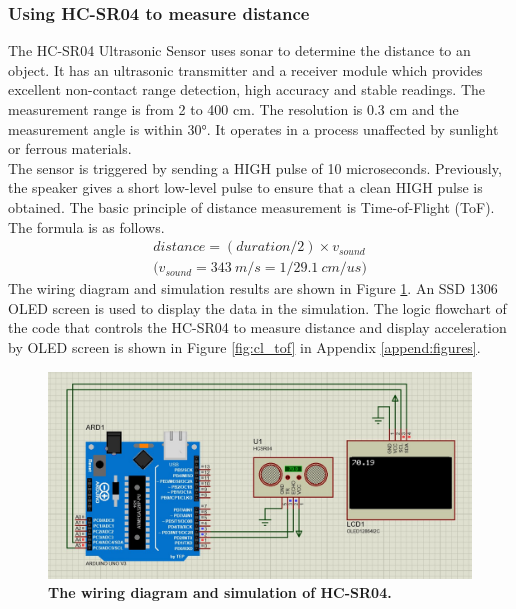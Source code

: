 \subsubsection{Using HC-SR04 to measure distance}
The HC-SR04 Ultrasonic Sensor uses sonar to determine the distance to an object. It has an ultrasonic 
transmitter and a receiver module which provides excellent non-contact range detection, high accuracy and 
stable readings. The measurement range is from 2 to 400 cm. The resolution is 0.3 cm and the measurement angle 
is within 30°. It operates in a process unaffected by sunlight or ferrous materials. \\
The sensor is triggered by sending a HIGH pulse of 10 microseconds. Previously, the speaker gives a short 
low-level pulse to ensure that a clean HIGH pulse is obtained. 
The basic principle of distance measurement is Time-of-Flight (ToF). The formula is as follows.
\vspace{-10mm}
\begin{align}
    distance = (duration/2) \times v_{sound} \\
    \text{(}v_{sound} = 343\ m/s = 1/29.1\ cm/us \text{)}\nonumber
\end{align}
\noindent The wiring diagram and simulation results are shown in Figure \ref{fig:tof}. An SSD 1306 OLED screen 
is used to display the data in the simulation. The logic flowchart of the code that controls the HC-SR04 to measure 
distance and display acceleration by OLED screen is shown in Figure \ref{fig:cl_tof} in Appendix \ref{append:figures}.
\begin{figure}[H] %
    \centering 
    \captionsetup{labelsep=colon}
    \includegraphics[width=0.9\linewidth]{Image/Design/tof_circuit.jpg}
    \caption[The wiring diagram and simulation of HC-SR04]
    {\centering \textbf{The wiring diagram and simulation of HC-SR04.}}
    \label{fig:tof}
\end{figure}

